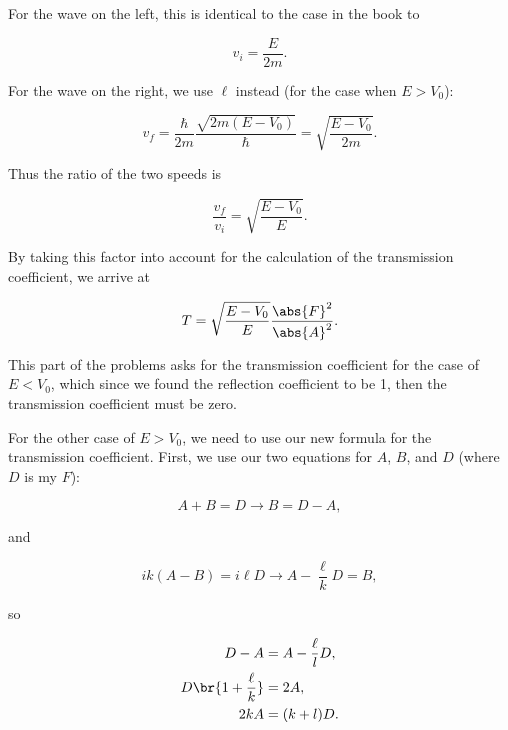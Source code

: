 \begin{parts}
For the wave on the left, this is identical to the case in the book to 

\begin{equation*}
    v_i = \frac{E}{2m}.
\end{equation*}

For the wave on the right, we use $\ell$ instead (for the case when $E>V_0$):

\begin{equation*}
    v_f = \frac{\hbar}{2m}\frac{\sqrt{2m(E-V_0)}}{\hbar} = \sqrt{\frac{E - V_0}{2m}}.
\end{equation*}

Thus the ratio of the two speeds is 

\begin{equation}
    \frac{v_f}{v_i} = \sqrt{\frac{E - V_0}{E}}.
\end{equation}

By taking this factor into account for the calculation of the transmission coefficient, we arrive at

\begin{equation}
    T = \sqrt{\frac{E - V_0}{E}} \frac{\abs{F}^2}{\abs{A}^2}.
\end{equation}

This part of the problems asks for the transmission coefficient for the case of $E<V_0$, which since we found the reflection coefficient to be 1, then the transmission coefficient must be zero.





\item For the other case of $E>V_0$, we need to use our new formula for the transmission coefficient. First, we use our two equations for $A$, $B$, and $D$ (where $D$ is my $F$):

\begin{equation*}
    A+B = D \rightarrow B = D-A,
\end{equation*}

and

\begin{equation*}
    ik(A-B) = i\ell D \rightarrow A - \frac{\ell}{k}D = B,
\end{equation*}

so

\begin{align*}
    D-A &= A - \frac{\ell}{l}D, \\
    D\br{1 + \frac{\ell}{k}} &= 2A, \\
    2kA &= (k+l)D.
\end{align*}


\end{parts}
